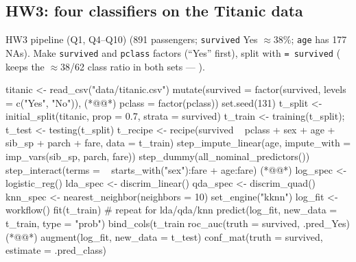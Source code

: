 \subsection{HW3: four classifiers on the Titanic data}

\begin{topic}{HW3 pipeline (Q1, Q4--Q10)}
\quad {} (891 passengers; \texttt{survived} Yes $\approx38\%$; \texttt{age} has 177 NAs).
Make \texttt{survived} and \texttt{pclass} factors (``Yes'' first), split with  \texttt{= survived}
( keeps the $\approx$38/62 class ratio in both sets --- ).
\begin{rcode}
titanic <- read_csv("data/titanic.csv") %
  mutate(survived = factor(survived, levels = c("Yes", "No")),  (*@@*)
         pclass = factor(pclass))
set.seed(131)
t_split <- initial_split(titanic, prop = 0.7, strata = survived)
t_train <- training(t_split); t_test <- testing(t_split)
t_recipe <- recipe(survived ~ pclass + sex + age + sib_sp + parch + fare,
                   data = t_train) %
  step_impute_linear(age, impute_with = imp_vars(sib_sp, parch, fare)) %
  step_dummy(all_nominal_predictors()) %
  step_interact(terms = ~ starts_with("sex"):fare + age:fare)  (*@@*)
log_spec <- logistic_reg() %
lda_spec <- discrim_linear() %
qda_spec <- discrim_quad() %
knn_spec <- nearest_neighbor(neighbors = 10) %
  set_engine("kknn") %
log_fit <- workflow() %
  fit(t_train)                                  # repeat for lda/qda/knn
predict(log_fit, new_data = t_train, type = "prob") %
  bind_cols(t_train %
  roc_auc(truth = survived, .pred_Yes)                     (*@@*)
augment(log_fit, new_data = t_test) %
  conf_mat(truth = survived, estimate = .pred_class) %

\end{rcode}
\end{topic}

